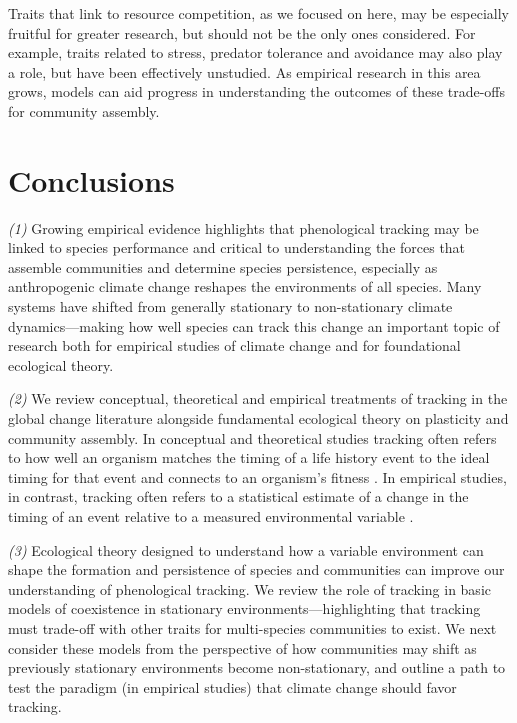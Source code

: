 \documentclass[11pt,letterpaper]{article}
\begin{document}
Traits that link to resource competition, as we focused on here, may be especially fruitful for greater research, but should not be the only ones considered. For example, traits related to stress, predator tolerance and avoidance may also play a role, but have been effectively unstudied.  As empirical research in this area grows, models can aid progress in understanding the outcomes of these trade-offs for community assembly.  

\section{Conclusions}
\emph{(1)} Growing empirical evidence highlights that phenological tracking may be linked to species performance and critical to understanding the forces that assemble communities and determine species persistence, especially as anthropogenic climate change reshapes the environments of all species. Many systems have shifted from generally stationary to non-stationary climate dynamics---making how well species can track this change an important topic of research both for empirical studies of climate change and for foundational ecological theory. 

\emph{(2)} We review conceptual, theoretical and empirical treatments of tracking in the global change literature alongside fundamental ecological theory on plasticity and community assembly. In conceptual and theoretical studies tracking often refers to how well an organism matches the timing of a life history event to the ideal timing for that event and connects to an organism's fitness \citep{vissergienapp2019}. In empirical studies, in contrast, tracking often refers to a statistical estimate of a change in the timing of an event relative to a measured environmental variable \citep[such as temperature or precipitation,][]{chmura2019}. 

\emph{(3)} Ecological theory designed to understand how a variable environment can shape the formation and persistence of species and communities can improve our understanding of phenological tracking.  We review the role of tracking in basic models of coexistence in stationary environments---highlighting that tracking must trade-off with other traits for multi-species communities to exist. We next consider these models from the perspective of how communities may shift as previously stationary environments become non-stationary, and outline a path to test the paradigm (in empirical studies) that climate change should favor tracking.
\end{document}
